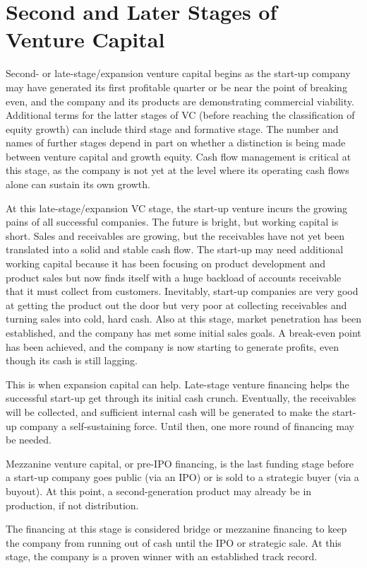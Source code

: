 \documentclass[11pt]{article}
\begin{document}
\section*{Second and Later Stages of Venture Capital}
Second- or late-stage/expansion venture capital begins as the start-up company may have generated its first profitable quarter or be near the point of breaking even, and the company and its products are demonstrating commercial viability. Additional terms for the latter stages of VC (before reaching the classification of equity growth) can include third stage and formative stage. The number and names of further stages depend in part on whether a distinction is being made between venture capital and growth equity. Cash flow management is critical at this stage, as the company is not yet at the level where its operating cash flows alone can sustain its own growth.

At this late-stage/expansion VC stage, the start-up venture incurs the growing pains of all successful companies. The future is bright, but working capital is short. Sales and receivables are growing, but the receivables have not yet been translated into a solid and stable cash flow. The start-up may need additional working capital because it has been focusing on product development and product sales but now finds itself with a huge backload of accounts receivable that it must collect from customers. Inevitably, start-up companies are very good at getting the product out the door but very poor at collecting receivables and turning sales into cold, hard cash. Also at this stage, market penetration has been established, and the company has met some initial sales goals. A break-even point has been achieved, and the company is now starting to generate profits, even though its cash is still lagging.

This is when expansion capital can help. Late-stage venture financing helps the successful start-up get through its initial cash crunch. Eventually, the receivables will be collected, and sufficient internal cash will be generated to make the start-up company a self-sustaining force. Until then, one more round of financing may be needed.

Mezzanine venture capital, or pre-IPO financing, is the last funding stage before a start-up company goes public (via an IPO) or is sold to a strategic buyer (via a buyout). At this point, a second-generation product may already be in production, if not distribution.

The financing at this stage is considered bridge or mezzanine financing to keep the company from running out of cash until the IPO or strategic sale. At this stage, the company is a proven winner with an established track record.
\end{document}
